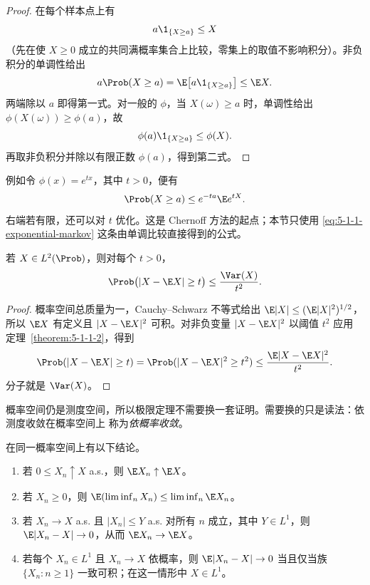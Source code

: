 \begin{proof}
在每个样本点上有
\[
 a\1_{\{X\ge a\}}\le X
\]
（先在使 $X\ge0$ 成立的共同满概率集合上比较，零集上的取值不影响积分）。非负积分的单调性给出
\[
 a\Prob(X\ge a)=\E\bigl[a\1_{\{X\ge a\}}\bigr]\le\E X.
\]
两端除以 $a$ 即得第一式。对一般的 $\phi$，当 $X(\omega)\ge a$ 时，单调性给出
$\phi(X(\omega))\ge\phi(a)$，故
\[
 \phi(a)\1_{\{X\ge a\}}\le\phi(X).
\]
再取非负积分并除以有限正数 $\phi(a)$，得到第二式。
\end{proof}

例如令 $\phi(x)=e^{tx}$，其中 $t>0$，便有
\begin{equation}\label{eq:5-1-1-exponential-markov}
 \Prob(X\ge a)\le e^{-ta}\E e^{tX}.
\end{equation}
右端若有限，还可以对 $t$ 优化。这是 Chernoff 方法的起点；本节只使用
\eqref{eq:5-1-1-exponential-markov} 这条由单调比较直接得到的公式。

\begin{corollary}\label{corollary:5-1-1-3}
若 $X\in L^2(\Prob)$，则对每个 $t>0$，
\[
 \Prob\bigl(|X-\E X|\ge t\bigr)
 \le\frac{\Var(X)}{t^2}.
\]
\end{corollary}

\begin{proof}
概率空间总质量为一，Cauchy--Schwarz 不等式给出
$\E|X|\le(\E|X|^2)^{1/2}$，所以 $\E X$ 有定义且
$|X-\E X|^2$ 可积。对非负变量 $|X-\E X|^2$ 以阈值 $t^2$ 应用
定理~\ref{theorem:5-1-1-2}，得到
\[
 \Prob(|X-\E X|\ge t)
 =\Prob(|X-\E X|^2\ge t^2)
 \le\frac{\E|X-\E X|^2}{t^2}.
\]
分子就是 $\Var(X)$。
\end{proof}

概率空间仍是测度空间，所以极限定理不需要换一套证明。需要换的只是读法：依测度收敛在概率空间上
称为\emph{依概率收敛}。

\begin{proposition}[期望继承积分的极限定理]\label{proposition:5-1-1-4}
在同一概率空间上有以下结论。
\begin{enumerate}[label=\textup{(\roman*)}]
  \item 若 $0\le X_n\uparrow X$ a.s.，则 $\E X_n\uparrow\E X$。
  \item 若 $X_n\ge0$，则
  $\E(\liminf_nX_n)\le\liminf_n\E X_n$。
  \item 若 $X_n\to X$ a.s. 且 $|X_n|\le Y$ a.s. 对所有 $n$ 成立，其中
  $Y\in L^1$，则 $\E|X_n-X|\to0$，从而 $\E X_n\to\E X$。
  \item 若每个 $X_n\in L^1$ 且 $X_n\to X$ 依概率，则
  $\E|X_n-X|\to0$ 当且仅当族 $\{X_n:n\ge1\}$ 一致可积；在这一情形中
  $X\in L^1$。
\end{enumerate}
\end{proposition}

